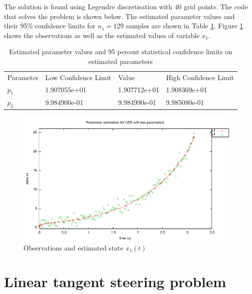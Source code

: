 \documentclass[a4paper,11pt]{report}    %
\newenvironment{shadedframe}{%
  \def\FrameCommand{\fcolorbox{black}{shadecolor}}%
  \MakeFramed {\FrameRestore}}
{\endMakeFramed}
\begin{document}
The solution is found using Legendre discretisation with 40 grid points. The code that solves the problem is shown below. The estimated parameter values and their 95$\%$ confidence limits for $n_s=129$ samples are shown in Table \ref{li-example-tab1}. Figure \ref{fig:param2_x1} shows the observations as well as the estimated values of variable $x_1$.

\tiny
\begin{shadedframe}

\end{shadedframe}
\normalsize

\begin{table}
\label{li-example-tab1}
\caption{Estimated parameter values and 95 percent statistical confidence limits on estimated parameters} 
\begin{tabular}{llll}
\hline
Parameter &	Low Confidence Limit &	Value 	&	High Confidence Limit\\
$p_1$	&	1.907055e+01	&	1.907712e+01	&	1.908369e+01\\
$p_2$	&	9.984900e-01	&	9.984990e-01	&	9.985080e-01\\
\hline
\end{tabular}
\end{table}

\begin{figure}
  \centering 
  \includegraphics{../examples/param2/x1.pdf}
  \caption{Observations and estimated state $x_1(t)$}
 \label{fig:param2_x1}
\end{figure}



\section{Linear tangent steering problem}
\end{document}
